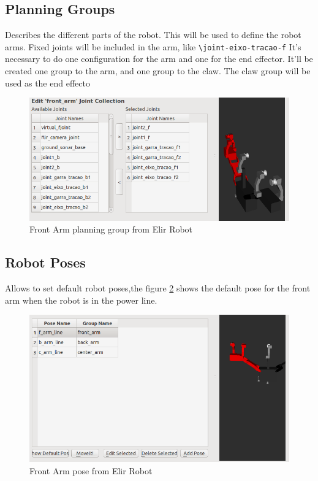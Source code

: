 \documentclass[12pt, a4paper, oneside]{article}
\begin{document}
	\subsection{Planning Groups}
	Describes the different parts of the robot. This will be used to define the robot arms.
	Fixed joints will be included in the arm, like \verb|\joint-eixo-tracao-f|
	It's necessary to do one configuration for the arm and one for the end effector.
	It'll be created one group to the arm, and one group to the claw. The claw group will be used as the end effecto
		
	\begin{figure}[h]
		\centering
		\includegraphics[width=1\textwidth]{planing_groups.png}
		\caption{Front Arm planning group from Elir Robot}
		\label{fig:plan_grp}
	\end{figure}

	\subsection{Robot Poses}
	Allows to set default robot poses,the figure \ref{fig:pose1} shows the default pose for the front arm when the robot is
	in the power line.
	
	\begin{figure}[h]
		\centering
		\includegraphics[width=.75\textwidth]{pose1.png}
		\caption{Front Arm pose from Elir Robot}
		\label{fig:pose1}
	\end{figure}
	
\end{document}
